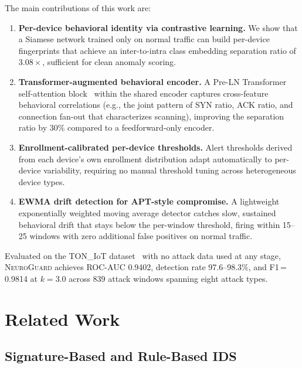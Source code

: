 \documentclass[journal,10pt,twoside]{IEEEtran}
\newcommand{\neuroguard}{\textsc{NeuroGuard}}
\begin{document}
The main contributions of this work are:

\begin{enumerate}
  \item \textbf{Per-device behavioral identity via contrastive learning.}
    We show that a Siamese network trained only on normal traffic can build
    per-device fingerprints that achieve an inter-to-intra class embedding
    separation ratio of $3.08\times$, sufficient for clean anomaly scoring.

  \item \textbf{Transformer-augmented behavioral encoder.}
    A Pre-LN Transformer self-attention block~\cite{xiong2020preln} within the
    shared encoder captures cross-feature behavioral correlations (e.g., the
    joint pattern of SYN ratio, ACK ratio, and connection fan-out that
    characterizes scanning), improving the separation ratio by 30\% compared
    to a feedforward-only encoder.

  \item \textbf{Enrollment-calibrated per-device thresholds.}
    Alert thresholds derived from each device's own enrollment distribution
    adapt automatically to per-device variability, requiring no manual
    threshold tuning across heterogeneous device types.

  \item \textbf{EWMA drift detection for APT-style compromise.}
    A lightweight exponentially weighted moving average detector catches
    slow, sustained behavioral drift that stays below the per-window threshold,
    firing within 15--25 windows with zero additional false positives on
    normal traffic.
\end{enumerate}

Evaluated on the TON\_IoT dataset~\cite{alsaedi2020toniot} with no attack data
used at any stage, \neuroguard{} achieves ROC-AUC 0.9402, detection rate
97.6--98.3\%, and F1\,=\,0.9814 at $k=3.0$ across 839 attack windows spanning
eight attack types.

\section{Related Work}
\label{sec:related}

\subsection{Signature-Based and Rule-Based IDS}
\end{document}
